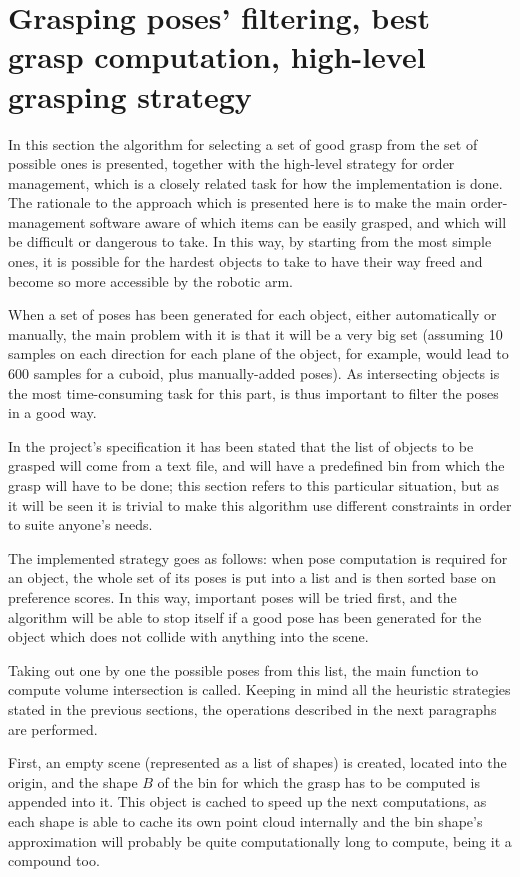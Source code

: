 \section{Grasping poses' filtering, best grasp computation, high-level
  grasping strategy}  \label{sec:best-grasp-computation}
In this section the algorithm for selecting a set of good grasp from the set of
possible ones is presented, together with the high-level strategy for
order management, which is a closely related task for how the
implementation is done. The rationale to the  approach which is
presented here is to make the main order-management software aware of
which items can be easily grasped, and which will be difficult or
dangerous to take. In this way, by starting from the most simple ones,
it is possible for the hardest objects to take to have their way
freed and become so more accessible by the robotic arm.

When a set of poses has been generated for each object, either automatically or
manually, the main problem with it is that it will be a very big set (assuming
10 samples on each direction for each plane of the object, for example, would
lead to 600 samples for a cuboid, plus manually-added poses). As intersecting
objects is the most time-consuming task for this part, is thus
important to filter the poses in a good way.

In the project's specification it has been stated that the list of
objects to be grasped will come from a text file, and will have a
predefined bin from which the grasp will have to be done; this section
refers to this particular situation, but as it will be seen it is
trivial to make this algorithm use different constraints in order to
suite anyone's needs.

The implemented strategy goes as follows: when pose computation is required for an object,  the whole set of
its poses is put into a list and is then sorted base on preference
scores.
In this way, important poses will be tried first, and the
algorithm will be able to stop itself if a good pose has been
generated for the object which does not collide with anything into the
scene.

Taking out one by one the possible poses from this list, the main
function to compute volume intersection is called. Keeping in mind all
the heuristic strategies stated in the previous sections, the
operations described in the next paragraphs are performed.

First, an empty scene (represented as a list of shapes) is created,
located into the origin, and the shape $B$ of the bin for which the grasp has to be computed
is appended into it. This object is cached to speed up the next
computations, as each shape is able to cache its own point cloud
internally and the bin shape's approximation will probably be quite computationally
long to compute, being it a compound too.

